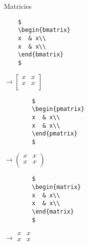 \documentclass[12pt]{article}
\begin{document}
\begin{multicols}{3}

\begin{latexBox}
{Matricies}
\begin{minipage}{5cm}
\begin{commandBox}
	\begin{verbatim}
	$
	\begin{bmatrix}
	x  & x\\
	x  & x\\
	\end{bmatrix}
	$
	\end{verbatim}
\end{commandBox}
\end{minipage}
 $\rightarrow
\begin{bmatrix}
x  & x\\
x  & x\\
\end{bmatrix}
$ \\


\begin{minipage}{5cm}
	\begin{commandBox}
		\begin{verbatim}
		$
		\begin{pmatrix}
		x  & x\\
		x  & x\\
		\end{pmatrix}
		$
		\end{verbatim}
	\end{commandBox}
\end{minipage}
$\rightarrow
\begin{pmatrix}
x  & x\\
x  & x\\
\end{pmatrix}
$ \\

\begin{minipage}{5cm}
	\begin{commandBox}
		\begin{verbatim}
		$
		\begin{matrix}
		x  & x\\
		x  & x\\
		\end{matrix}
		$
		\end{verbatim}
	\end{commandBox}
\end{minipage}
$\rightarrow
\begin{matrix}
x  & x\\
x  & x\\
\end{matrix}
$ \\


\end{latexBox}
\end{multicols}
\end{document}
